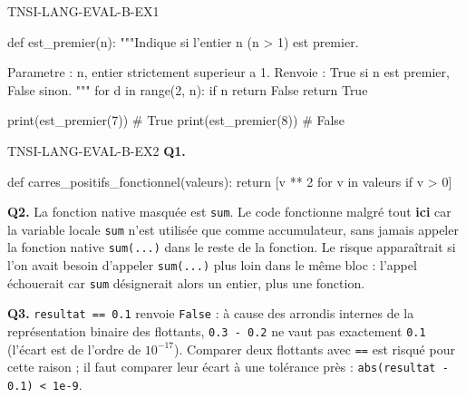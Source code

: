 %
%
\begin{corrige}{TNSI-LANG-EVAL-B-EX1}
\begin{python}
def est_premier(n):
    """Indique si l'entier n (n > 1) est premier.

    Parametre : n, entier strictement superieur a 1.
    Renvoie : True si n est premier, False sinon.
    """
    for d in range(2, n):
        if n %
            return False
    return True

print(est_premier(7))  # True
print(est_premier(8))  # False
\end{python}
\end{corrige}

\begin{corrige}{TNSI-LANG-EVAL-B-EX2}
\textbf{Q1.}
\begin{python}
def carres_positifs_fonctionnel(valeurs):
    return [v ** 2 for v in valeurs if v > 0]
\end{python}

\textbf{Q2.} La fonction native masquée est \lstinline{sum}. Le code fonctionne malgré tout \textbf{ici} car la variable locale \lstinline{sum} n'est utilisée que comme accumulateur, sans jamais appeler la fonction native \lstinline{sum(...)} dans le reste de la fonction. Le risque apparaîtrait si l'on avait besoin d'appeler \lstinline{sum(...)} plus loin dans le même bloc : l'appel échouerait car \lstinline{sum} désignerait alors un entier, plus une fonction.

\textbf{Q3.} \lstinline{resultat == 0.1} renvoie \lstinline{False} : à cause des arrondis internes de la représentation binaire des flottants, \lstinline{0.3 - 0.2} ne vaut pas exactement \lstinline{0.1} (l'écart est de l'ordre de $10^{-17}$). Comparer deux flottants avec \lstinline{==} est risqué pour cette raison ; il faut comparer leur écart à une tolérance près : \lstinline{abs(resultat - 0.1) < 1e-9}.
\end{corrige}
